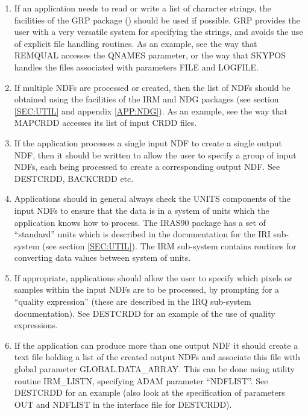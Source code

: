 \begin{enumerate}

\item If an application needs to read or write a list of character
strings, the facilities of the {\small GRP} package
() should be
used if possible.  {\small GRP} provides the user with a very versatile
system for specifying the strings, and avoids the use of explicit file
handling routines. As an example, see the way that {\small REMQUAL}
accesses the {\small QNAMES} parameter, or the way that {\small SKYPOS}
handles the files associated with parameters {\small FILE} and {\small
LOGFILE}.

\item If multiple {\small NDF}s are processed or created, then the list
of {\small NDF}s should be obtained using the facilities of the {\small
IRM} and {\small NDG} packages (see section \ref{SEC:UTIL} and appendix
\ref{APP:NDG}). As an example, see the way that {\small MAPCRDD} accesses 
its list of input {\small CRDD} files.

\item If the application processes a single input {\small NDF} to
create a single output {\small NDF}, then it should be written to allow
the user to specify a group of input {\small NDF}s, each being
processed to create a corresponding output {\small NDF}. See {\small
DESTCRDD, BACKCRDD} etc.

\item Applications should in general always check the {\small UNITS}
components of the input {\small NDF}s to ensure that the data is in a
system of units which the application knows how to process. The {\small
IRAS90} package has a set of ``standard'' units which is described in
the documentation for the {\small IRI} sub-system (see section
\ref{SEC:UTIL}). The {\small IRM} sub-system contains routines for
converting data values between system of units.

\item If appropriate, applications should allow the user to specify
which pixels or samples within the input {\small NDF}s are to be
processed, by prompting for a ``quality expression'' (these are
described in the {\small IRQ} sub-system documentation). See {\small
DESTCRDD} for an example of the use of quality expressions.

\item \label{IT:NDFLIST} If the application can produce more than one
output {\small NDF} it should create a text file holding a list of the
created output {\small NDF}s and associate this file with global
parameter {\small GLOBAL.DATA\_ARRAY}. This can be done using utility
routine {\small IRM\_LISTN}, specifying {\small ADAM} parameter
``{\small NDFLIST}''. See {\small DESTCRDD} for an example (also look
at the specification of parameters {\small OUT} and {\small NDFLIST} in
the interface file for {\small DESTCRDD}).


\end{enumerate}
